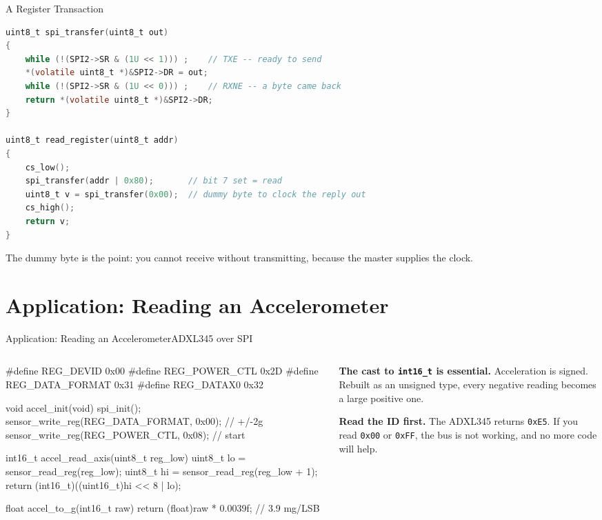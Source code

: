 \documentclass[9pt,aspectratio=169,xcolor=table]{beamer}
\begin{document}
\begin{frame}[fragile]{A Register Transaction}
\begin{lstlisting}[language=C, basicstyle=\ttfamily\scriptsize]
uint8_t spi_transfer(uint8_t out)
{
    while (!(SPI2->SR & (1U << 1))) ;    // TXE -- ready to send
    *(volatile uint8_t *)&SPI2->DR = out;
    while (!(SPI2->SR & (1U << 0))) ;    // RXNE -- a byte came back
    return *(volatile uint8_t *)&SPI2->DR;
}

uint8_t read_register(uint8_t addr)
{
    cs_low();
    spi_transfer(addr | 0x80);       // bit 7 set = read
    uint8_t v = spi_transfer(0x00);  // dummy byte to clock the reply out
    cs_high();
    return v;
}
\end{lstlisting}

    \vspace{1mm}
    {\small The \alert{dummy byte} is the point: you cannot receive without
    transmitting, because the master supplies the clock.}
\end{frame}


\section{Application: Reading an Accelerometer}

\begin{frame}[fragile]{Application: Reading an Accelerometer}{ADXL345 over SPI}
    \begin{columns}[T]
    \begin{column}{.58\textwidth}
\begin{cc}[basicstyle=\ttfamily\scriptsize]
#define REG_DEVID        0x00
#define REG_POWER_CTL    0x2D
#define REG_DATA_FORMAT  0x31
#define REG_DATAX0       0x32

void accel_init(void) {
    spi_init();
    sensor_write_reg(REG_DATA_FORMAT, 0x00); // +/-2g
    sensor_write_reg(REG_POWER_CTL,   0x08); // start
}

int16_t accel_read_axis(uint8_t reg_low) {
    uint8_t lo = sensor_read_reg(reg_low);
    uint8_t hi = sensor_read_reg(reg_low + 1);
    return (int16_t)((uint16_t)hi << 8 | lo);
}

float accel_to_g(int16_t raw) {
    return (float)raw * 0.0039f;   // 3.9 mg/LSB
}
\end{cc}
    \end{column}
    \begin{column}{.38\textwidth}
        {\small
        \textbf{The cast to \texttt{int16\_t} is essential.} Acceleration is signed. Rebuilt as an unsigned type, every negative reading becomes a large positive one.

        \vspace{2mm}
        \textbf{Read the ID first.} The ADXL345 returns \texttt{0xE5}. If you read \texttt{0x00} or \texttt{0xFF}, the bus is not working, and no more code will help.}
    \end{column}
    \end{columns}
\end{frame}
\end{document}
